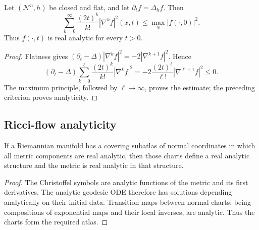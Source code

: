 \begin{proposition}
\label{prop:chow-ii-flat-heat-real-analyticity}
Let \((\mathcal N^n,h)\) be closed and flat, and let
\(\partial_tf=\Delta_hf\).  Then
\[
 \sum_{k=0}^{\infty}\frac{(2t)^k}{k!}|\nabla^kf|^2(x,t)
 \leq\max_{\mathcal N}|f(\cdot,0)|^2.
\]
Thus \(f(\cdot,t)\) is real analytic for every \(t>0\).
\end{proposition}
\begin{proof}
\sketch
{}
Flatness gives
\((\partial_t-\Delta)|\nabla^kf|^2=-2|\nabla^{k+1}f|^2\).  Hence
\[
 (\partial_t-\Delta)\sum_{k=0}^{\ell}
 \frac{(2t)^k}{k!}|\nabla^kf|^2
 =-2\frac{(2t)^\ell}{\ell!}|\nabla^{\ell+1}f|^2\leq0.
\]
The maximum principle, followed by \(\ell\to\infty\), proves the estimate;
the preceding criterion proves analyticity.
\end{proof}

\subsection{Ricci-flow analyticity}

\begin{lemma}
\label{lem:chow-ii-normal-coordinate-analytic-atlas}
If a Riemannian manifold has a covering subatlas of normal coordinates in
which all metric components are real analytic, then those charts define a
real analytic structure and the metric is real analytic in that structure.
\end{lemma}
\begin{proof}
\sketch
The Christoffel symbols are analytic functions of the metric and its first
derivatives.  The analytic geodesic ODE therefore has solutions depending
analytically on their initial data.  Transition maps between normal charts,
being compositions of exponential maps and their local inverses, are
analytic.  Thus the charts form the required atlas.
\end{proof}

